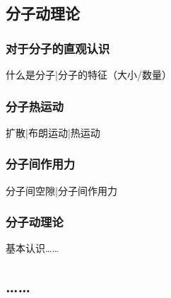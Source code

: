 

\subsection{分子动理论}
\subsubsection{对于分子的直观认识}
什么是分子|分子的特征（大小/数量）
\subsubsection{分子热运动}
扩散|布朗运动|热运动
\subsubsection{分子间作用力}
分子间空隙|分子间作用力
\subsubsection{分子动理论}
基本认识……

\subsection{……}
